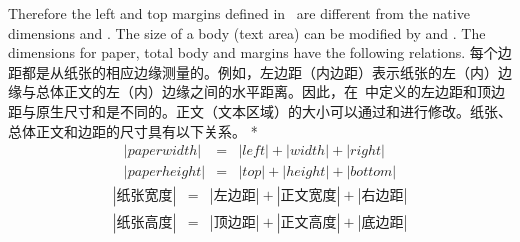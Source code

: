 \begin{paracol}{2}
Therefore the left and top margins defined in \Gm\ are different
from the native dimensions  and .
The size of a body (text area) can be modified by  and
. 
The dimensions for paper, total body and margins have the following
relations.
\switchcolumn
每个边距都是从纸张的相应边缘测量的。例如，左边距（内边距）表示纸张的左（内）边缘与总体正文的左（内）边缘之间的水平距离。因此，在\Gm\ 中定义的左边距和顶边距与原生尺寸和是不同的。正文（文本区域）的大小可以通过和进行修改。纸张、总体正文和边距的尺寸具有以下关系。
\switchcolumn[0]*
\begin{eqnarray}
 \label{eq:paperwidth}
 |paperwidth| &=& |left|+|width|+|right| \\
 |paperheight| &=& |top|+|height|+|bottom|
 \label{eq:paperheight}
\end{eqnarray}
\switchcolumn
\begin{eqnarray}
\label{eq:paperwidth}
|纸张宽度| &=& |左边距|+|正文宽度|+|右边距| \\
|纸张高度| &=& |顶边距|+|正文高度|+|底边距|
\label{eq:paperheight}
\end{eqnarray}



\end{paracol}


